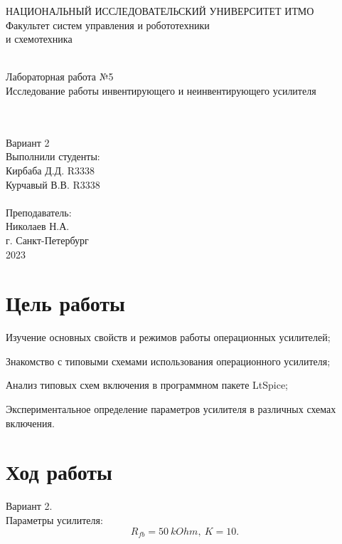 \documentclass[12pt]{article}
\begin{document}
\begin{titlepage}
\begin{center}
    {\small НАЦИОНАЛЬНЫЙ ИССЛЕДОВАТЕЛЬСКИЙ УНИВЕРСИТЕТ ИТМО} \\
    {\small Факультет систем управления и робототехники} \\
    \vspace*{10\baselineskip}
    { и схемотехника} \\
    \ \\
    \begin{spacing}{1.5}
    {\large Лабораторная работа №5 \\
    Исследование работы инвентирующего и неинвентирующего усилителя} \\
    \end{spacing} \\
    \ \\
    Вариант 2 \\
    \vspace*{10\baselineskip}
    \hfill {Выполнили студенты:} \\
    \hfill {Кирбаба Д.Д. R3338} \\
    \hfill {Курчавый В.В. R3338} \\
    \ \\
    \hfill {Преподаватель:} \\
    \hfill {Николаев Н.А.} \\
    \mbox{}
    \vfill {г. Санкт-Петербург\\2023}
\end{center}
\end{titlepage}

\section*{Цель работы}
\begin{itemsize}
    \item Изучение основных свойств и режимов работы операционных усилителей;
    \item Знакомство с типовыми схемами использования операционного усилителя;
    \item Анализ типовых схем включения в программном пакете LtSpice;
    \item Экспериментальное определение параметров усилителя в различных схемах включения.
\end{itemsize}

\section*{Ход работы}
Вариант 2.\\
Параметры усилителя:
\[
    R_{fb} = 50 \ kOhm, \ K = 10.
\]
\end{document}
